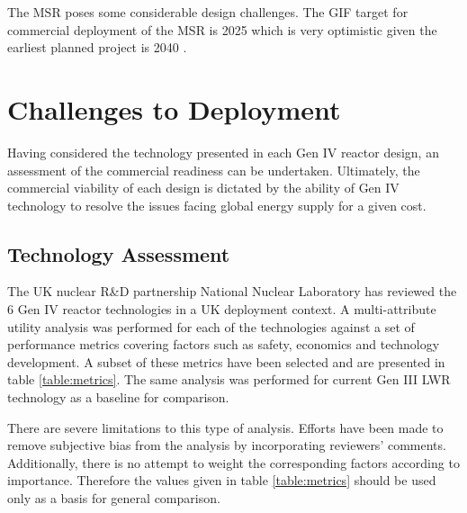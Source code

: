 \documentclass[journal]{IEEEtran}
\begin{document}
The MSR poses some considerable design challenges.
The GIF target for commercial deployment of the MSR is 2025 \cite{GenIVRoadmap} which is very optimistic given the earliest planned project is 2040 \cite{Locatelli2013}.


\section{Challenges to Deployment}
%

Having considered the technology presented in each Gen IV reactor design, an assessment of the commercial readiness can be undertaken.
Ultimately, the commercial viability of each design is dictated by the ability of Gen IV technology to resolve the issues facing global energy supply for a given cost.

\subsection{Technology Assessment}
The UK nuclear R\&D partnership National Nuclear Laboratory has reviewed the 6 Gen IV reactor technologies in a UK deployment context.
A multi-attribute utility analysis was performed for each of the technologies against a set of performance metrics covering factors such as safety, economics and technology development.
A subset of these metrics have been selected and are presented in table \ref{table:metrics}.
The same analysis was performed for current Gen III LWR technology as a baseline for comparison.

There are severe limitations to this type of analysis.
Efforts have been made to remove subjective bias from the analysis by incorporating reviewers' comments.
Additionally, there is no attempt to weight the corresponding factors according to importance.
Therefore the values given in table \ref{table:metrics} should be used only as a basis for general comparison.
\end{document}
